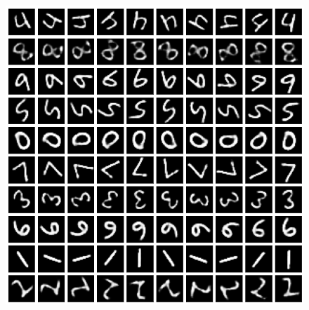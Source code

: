 \begin{frame}
\begin{figure}[h!]
\begin{minipage}{0.32\textwidth}
		\end{minipage}
		\begin{minipage}{0.32\textwidth}
			\hfill
			\includegraphics[scale=0.12]{Bilder/rotatingMNIST_VAElat2}
		\end{minipage}
		

\end{figure}
\end{frame}
